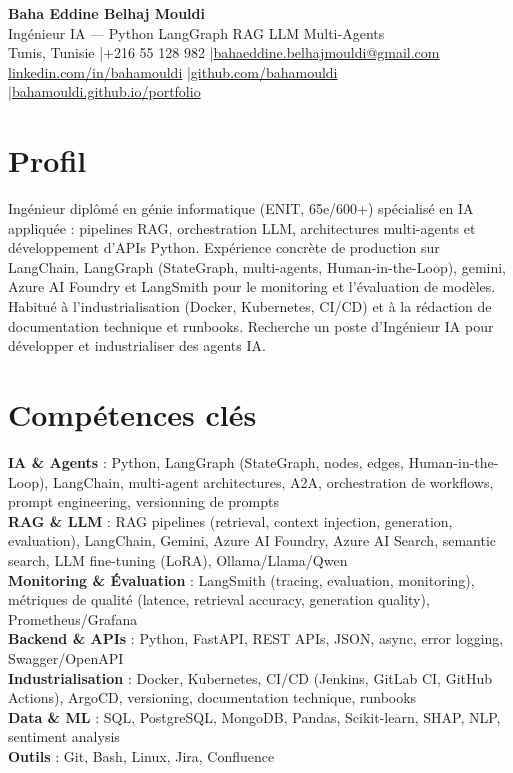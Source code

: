 \documentclass[a4paper,10pt]{article}
\begin{document}
\begin{center}
{\LARGE\bfseries\color{navy} Baha Eddine Belhaj Mouldi}\\[3pt]
{\large Ingénieur IA --- Python \textbar LangGraph \textbar RAG \textbar LLM \textbar Multi-Agents}\\[4pt]
Tunis, Tunisie \quad|\quad +216 55 128 982 \quad|\quad \href{mailto:bahaeddine.belhajmouldi@gmail.com}{bahaeddine.belhajmouldi@gmail.com}\\[1pt]
\href{https://www.linkedin.com/in/bahamouldi}{linkedin.com/in/bahamouldi} \quad|\quad \href{https://github.com/bahamouldi}{github.com/bahamouldi} \quad|\quad \href{https://bahamouldi.github.io/portfolio/}{bahamouldi.github.io/portfolio}
\end{center}
\vspace{2pt}
\section{Profil}
Ingénieur diplômé en génie informatique (ENIT, 65e/600+) spécialisé en IA appliquée : pipelines RAG, orchestration LLM, architectures multi-agents et développement d'APIs Python. Expérience concrète de production sur LangChain, LangGraph (StateGraph, multi-agents, Human-in-the-Loop), gemini, Azure AI Foundry et LangSmith pour le monitoring et l'évaluation de modèles. Habitué à l'industrialisation (Docker, Kubernetes, CI/CD) et à la rédaction de documentation technique et runbooks. Recherche un poste d'Ingénieur IA pour développer et industrialiser des agents IA.

\section{Compétences clés}
\textbf{IA \& Agents} : Python, LangGraph (StateGraph, nodes, edges, Human-in-the-Loop), LangChain, multi-agent architectures, A2A, orchestration de workflows, prompt engineering, versionning de prompts\\[0.5pt]
\textbf{RAG \& LLM} : RAG pipelines (retrieval, context injection, generation, evaluation), LangChain, Gemini, Azure AI Foundry, Azure AI Search, semantic search, LLM fine-tuning (LoRA), Ollama/Llama/Qwen\\[0.5pt]
\textbf{Monitoring \& Évaluation} : LangSmith (tracing, evaluation, monitoring), métriques de qualité (latence, retrieval accuracy, generation quality), Prometheus/Grafana\\[0.5pt]
\textbf{Backend \& APIs} : Python, FastAPI, REST APIs, JSON, async, error logging, Swagger/OpenAPI\\[0.5pt]
\textbf{Industrialisation} : Docker, Kubernetes, CI/CD (Jenkins, GitLab CI, GitHub Actions), ArgoCD, versioning, documentation technique, runbooks\\[0.5pt]
\textbf{Data \& ML} : SQL, PostgreSQL, MongoDB, Pandas, Scikit-learn, SHAP, NLP, sentiment analysis\\[0.5pt]
\textbf{Outils} : Git, Bash, Linux, Jira, Confluence
\end{document}
